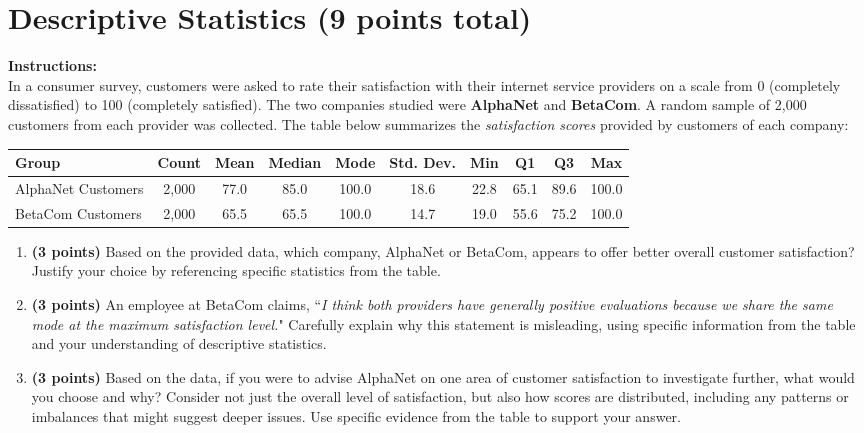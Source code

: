 \documentclass{article}
\newcommand{\blankbox}[2][3cm]{%
    \vspace{-0.5em}
    \begin{figure}[H]
        \makebox[\linewidth]{%
            \begin{tcolorbox}[
                colback=white,
                colframe=white,  %
                width=#2, %
                height=#1,
                boxrule=0.2mm
            ]
            \end{tcolorbox}
        }
    \end{figure}
    \vspace{-2em}
}
\begin{document}
\newpage

\section{Descriptive Statistics (9 points total)}
\noindent\textbf{Instructions:} \\
In a consumer survey, customers were asked to rate their satisfaction with their internet service providers on a scale from 0 (completely dissatisfied) to 100 (completely satisfied). The two companies studied were \textbf{AlphaNet} and \textbf{BetaCom}. A random sample of 2,000 customers from each provider was collected. The table below summarizes the \emph{satisfaction scores} provided by customers of each company:

\begin{center}
\begin{tabular}{|p{3.5cm}|c|c|c|c|c|c|c|c|c|}
\hline
\textbf{Group} & \textbf{Count} & \textbf{Mean} & \textbf{Median} & \textbf{Mode} & \textbf{Std. Dev.} & \textbf{Min} & \textbf{Q1} & \textbf{Q3} & \textbf{Max} \\
\hline
AlphaNet Customers & 2,000 & 77.0 & 85.0 & 100.0 & 18.6 & 22.8 & 65.1 & 89.6 & 100.0 \\
BetaCom Customers & 2,000 & 65.5 & 65.5 & 100.0 & 14.7 & 19.0 & 55.6 & 75.2 & 100.0 \\
\hline
\end{tabular}
\end{center}

\begin{enumerate}
\item \textbf{(3 points)} Based on the provided data, which company, AlphaNet or BetaCom, appears to offer better overall customer satisfaction? Justify your choice by referencing specific statistics from the table. \blankbox[5cm]{1.0\linewidth}

\item \textbf{(3 points)}  An employee at BetaCom claims, ``\emph{I think both providers have generally positive evaluations because we share the same mode at the maximum satisfaction level.}" Carefully explain why this statement is misleading, using specific information from the table and your understanding of descriptive statistics. \blankbox[6cm]{1.0\linewidth}

\item \textbf{(3 points)}  Based on the data, if you were to advise AlphaNet on one area of customer satisfaction to investigate further, what would you choose and why? Consider not just the overall level of satisfaction, but also how scores are distributed, including any patterns or imbalances that might suggest deeper issues. Use specific evidence from the table to support your answer. \blankbox[6cm]{1.0\linewidth}
\end{enumerate}
\end{document}
